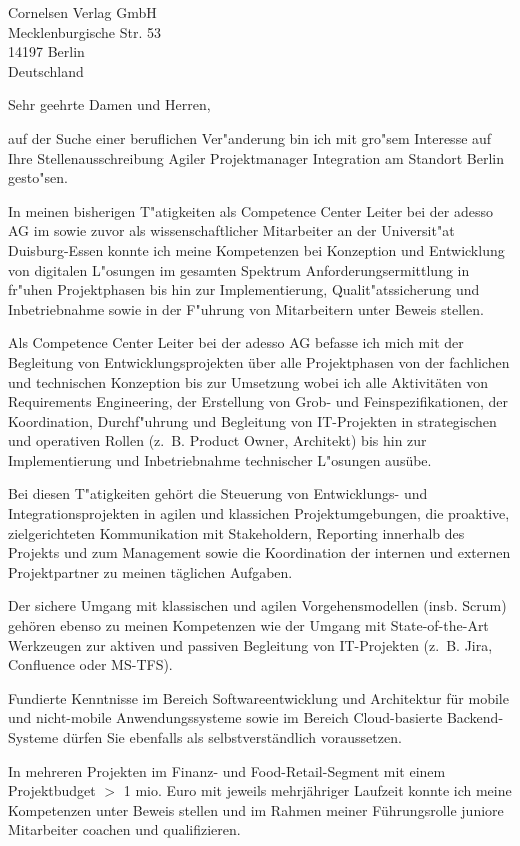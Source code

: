 \documentclass[10pt,a4paper]{dinbrief}
\date{\today}
\begin{document}
 
\begin{letter}  
{%
	Cornelsen Verlag GmbH\\
	Mecklenburgische Str. 53\\
	14197 Berlin\\
	Deutschland
}
\subject{\bf Bewerbung Agiler Projektmanager Integration}
\opening{Sehr geehrte Damen und Herren,}
auf der Suche einer beruflichen Ver"anderung bin ich mit gro"sem Interesse auf Ihre Stellenausschreibung Agiler Projektmanager Integration am Standort Berlin gesto"sen. 

In meinen bisherigen T"atigkeiten als Competence Center Leiter bei der adesso AG im sowie zuvor als wissenschaftlicher Mitarbeiter an der Universit"at Duisburg-Essen konnte ich meine Kompetenzen bei Konzeption und Entwicklung von digitalen L"osungen im gesamten Spektrum Anforderungsermittlung in fr"uhen Projektphasen bis hin zur Implementierung, Qualit"atssicherung und Inbetriebnahme sowie in der F"uhrung von Mitarbeitern unter Beweis stellen.

Als Competence Center Leiter bei der adesso AG befasse ich mich mit der Begleitung von Entwicklungsprojekten über alle Projektphasen von der fachlichen und technischen Konzeption bis zur Umsetzung wobei ich alle Aktivitäten von Requirements Engineering, der Erstellung von Grob- und Feinspezifikationen, der Koordination, Durchf"uhrung und Begleitung von IT-Projekten in strategischen und operativen Rollen (z.~B. Product Owner, Architekt) bis hin zur Implementierung und Inbetriebnahme technischer L"osungen ausübe.

Bei diesen T"atigkeiten gehört die Steuerung von Entwicklungs- und Integrationsprojekten in agilen und klassichen Projektumgebungen, die proaktive, zielgerichteten Kommunikation mit Stakeholdern, Reporting innerhalb des Projekts und zum Management sowie die Koordination der internen und externen Projektpartner zu meinen täglichen Aufgaben. 

Der sichere Umgang mit klassischen und agilen Vorgehensmodellen (insb. Scrum) gehören ebenso zu meinen Kompetenzen wie der Umgang mit State-of-the-Art Werkzeugen zur aktiven und passiven Begleitung von IT-Projekten (z.~B. Jira, Confluence oder MS-TFS). 

Fundierte Kenntnisse im Bereich Softwareentwicklung und Architektur für mobile und nicht-mobile Anwendungssysteme sowie im Bereich Cloud-basierte Backend-Systeme dürfen Sie ebenfalls als selbstverständlich voraussetzen.\clearpage

In mehreren Projekten im Finanz- und Food-Retail-Segment mit einem Projektbudget $>$ 1 mio. Euro mit jeweils mehrjähriger Laufzeit konnte ich meine Kompetenzen unter Beweis stellen und im Rahmen meiner Führungsrolle juniore Mitarbeiter coachen und qualifizieren. 


\end{letter}
\end{document}
